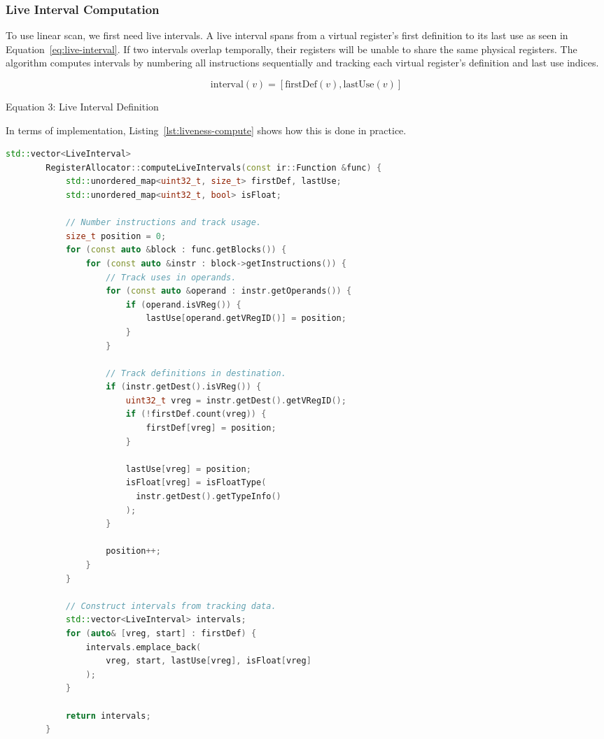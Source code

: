 \documentclass[11pt]{article}
\newcommand{\eqnref}[1]{Equation~\ref{#1}}
\newcommand{\lstref}[1]{Listing~\ref{#1}}
\begin{document}
\subsubsection{Live Interval Computation}

To use linear scan, we first need live intervals. A live interval spans from a virtual register's first definition to its last use as seen in \eqnref{eq:live-interval}. If two intervals overlap temporally, their registers will be unable to share the same physical registers. The algorithm computes intervals by numbering all instructions sequentially and tracking each virtual register's definition and last use indices.

\begin{eq}[!ht]
	\begin{equation}
		\label{eq:live-interval}
		\text{interval}(v) = [\text{firstDef}(v), \text{lastUse}(v)]
	\end{equation}
	\caption*{Equation 3: Live Interval Definition}
\end{eq}

In terms of implementation, \lstref{lst:liveness-compute} shows how this is done in practice.

\newpage

\begin{lstlisting}[language=C++, caption={Computing Live Intervals}, label={lst:liveness-compute}]
		std::vector<LiveInterval> 
		RegisterAllocator::computeLiveIntervals(const ir::Function &func) {
			std::unordered_map<uint32_t, size_t> firstDef, lastUse;
			std::unordered_map<uint32_t, bool> isFloat;
			
			// Number instructions and track usage.
			size_t position = 0;
			for (const auto &block : func.getBlocks()) {
				for (const auto &instr : block->getInstructions()) {
					// Track uses in operands.
					for (const auto &operand : instr.getOperands()) {
						if (operand.isVReg()) {
							lastUse[operand.getVRegID()] = position;
						}
					}
					
					// Track definitions in destination.
					if (instr.getDest().isVReg()) {
						uint32_t vreg = instr.getDest().getVRegID();
						if (!firstDef.count(vreg)) {
							firstDef[vreg] = position;
						}
                        
						lastUse[vreg] = position;
						isFloat[vreg] = isFloatType(
						  instr.getDest().getTypeInfo()
						);
					}
                    
					position++;
				}
			}
			
			// Construct intervals from tracking data.
			std::vector<LiveInterval> intervals;
			for (auto& [vreg, start] : firstDef) {
				intervals.emplace_back(
				    vreg, start, lastUse[vreg], isFloat[vreg]
				);
			}
			
			return intervals;
		}
	\end{lstlisting}
\end{document}
